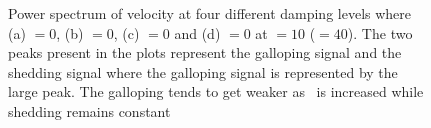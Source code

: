 \begin{figure}
  \setlength{\unitlength}{\textwidth}
  \caption{Power spectrum of velocity at four different damping levels where (a) \massdamp$=0$, (b) \massdamp$=0$, (c) \massdamp$=0$ and (d) \massdamp$=0$ at \massstiff $=10$ (\ustar$=40$). The two peaks present in the plots represent the galloping signal and the shedding signal where the galloping signal is represented by the large peak. The galloping tends to get weaker as \massdamp \ is increased while shedding remains constant}
    \label{fig:spectrum_pi1_10}
\end{figure}

